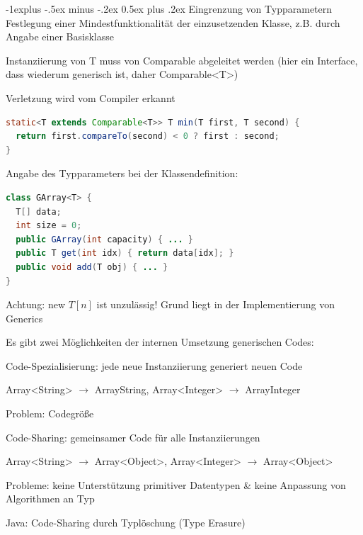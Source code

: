 \documentclass[10pt]{article}
\makeatletter
\renewcommand{\subsection}{\@startsection{subsection}{2}{0mm}%
                                {-1explus -.5ex minus -.2ex}%
                                {0.5ex plus .2ex}%
                                {\normalfont\normalsize\bfseries}}
\makeatother
\begin{document}
\subsection{Eingrenzung von Typparametern}
Festlegung einer Mindestfunktionalität der einzusetzenden Klasse, z.B. durch Angabe einer Basisklasse
\begin{itemize*}
  \item Instanziierung von T muss von Comparable abgeleitet werden (hier ein Interface, dass wiederum generisch ist, daher Comparable<T>)
  \item Verletzung wird vom Compiler erkannt
\end{itemize*}
\begin{lstlisting}[language=java]
static<T extends Comparable<T>> T min(T first, T second) {
  return first.compareTo(second) < 0 ? first : second;
}
\end{lstlisting}

Angabe des Typparameters bei der Klassendefinition:
\begin{lstlisting}[language=java]
class GArray<T> {
  T[] data;
  int size = 0;
  public GArray(int capacity) { ... }
  public T get(int idx) { return data[idx]; }
  public void add(T obj) { ... }
}
\end{lstlisting}

Achtung: new $T[n]$ ist unzulässig! Grund liegt in der Implementierung von Generics

Es gibt zwei Möglichkeiten der internen Umsetzung generischen Codes:
\begin{itemize*}
  \item Code-Spezialisierung: jede neue Instanziierung generiert neuen Code
  \begin{itemize*}
    \item Array<String> $\rightarrow$ ArrayString, Array<Integer> $\rightarrow$ ArrayInteger
    \item Problem: Codegröße
  \end{itemize*}
  \item Code-Sharing: gemeinsamer Code für alle Instanziierungen
  \begin{itemize*}
    \item Array<String> $\rightarrow$ Array<Object>, Array<Integer> $\rightarrow$ Array<Object>
    \item Probleme: keine Unterstützung primitiver Datentypen \& keine Anpassung von Algorithmen an Typ
  \end{itemize*}
\end{itemize*}
Java: Code-Sharing durch Typlöschung (Type Erasure)
\end{document}
